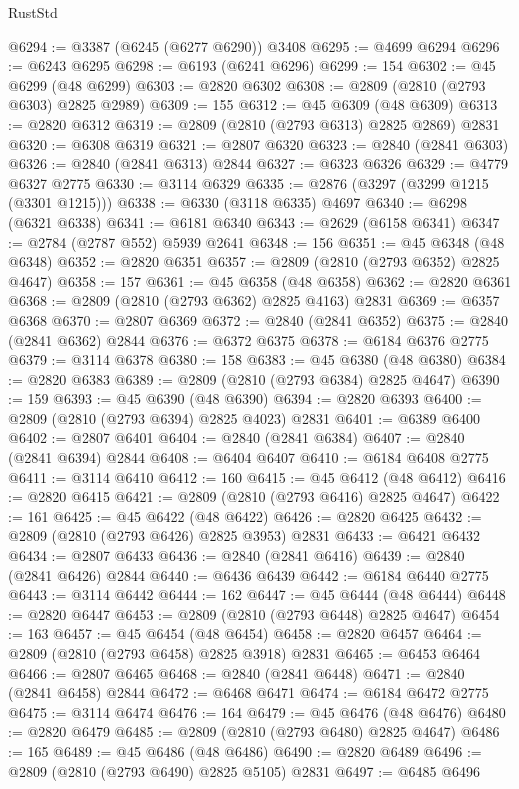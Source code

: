 \begin{lexlean}{RustStd}
\begin{coremodule}
@6294 := @3387 (@6245 (@6277 @6290)) @3408
@6295 := @4699 @6294
@6296 := @6243 @6295
@6298 := @6193 (@6241 @6296)
@6299 := 154
@6302 := @45 @6299 (@48 @6299)
@6303 := @2820 @6302
@6308 := @2809 (@2810 (@2793 @6303) @2825 @2989)
@6309 := 155
@6312 := @45 @6309 (@48 @6309)
@6313 := @2820 @6312
@6319 := @2809 (@2810 (@2793 @6313) @2825 @2869) @2831
@6320 := @6308 @6319
@6321 := @2807 @6320
@6323 := @2840 (@2841 @6303)
@6326 := @2840 (@2841 @6313) @2844
@6327 := @6323 @6326
@6329 := @4779 @6327 @2775
@6330 := @3114 @6329
@6335 := @2876 (@3297 (@3299 @1215 (@3301 @1215)))
@6338 := @6330 (@3118 @6335) @4697
@6340 := @6298 (@6321 @6338)
@6341 := @6181 @6340
@6343 := @2629 (@6158 @6341)
@6347 := @2784 (@2787 @552) @5939 @2641
@6348 := 156
@6351 := @45 @6348 (@48 @6348)
@6352 := @2820 @6351
@6357 := @2809 (@2810 (@2793 @6352) @2825 @4647)
@6358 := 157
@6361 := @45 @6358 (@48 @6358)
@6362 := @2820 @6361
@6368 := @2809 (@2810 (@2793 @6362) @2825 @4163) @2831
@6369 := @6357 @6368
@6370 := @2807 @6369
@6372 := @2840 (@2841 @6352)
@6375 := @2840 (@2841 @6362) @2844
@6376 := @6372 @6375
@6378 := @6184 @6376 @2775
@6379 := @3114 @6378
@6380 := 158
@6383 := @45 @6380 (@48 @6380)
@6384 := @2820 @6383
@6389 := @2809 (@2810 (@2793 @6384) @2825 @4647)
@6390 := 159
@6393 := @45 @6390 (@48 @6390)
@6394 := @2820 @6393
@6400 := @2809 (@2810 (@2793 @6394) @2825 @4023) @2831
@6401 := @6389 @6400
@6402 := @2807 @6401
@6404 := @2840 (@2841 @6384)
@6407 := @2840 (@2841 @6394) @2844
@6408 := @6404 @6407
@6410 := @6184 @6408 @2775
@6411 := @3114 @6410
@6412 := 160
@6415 := @45 @6412 (@48 @6412)
@6416 := @2820 @6415
@6421 := @2809 (@2810 (@2793 @6416) @2825 @4647)
@6422 := 161
@6425 := @45 @6422 (@48 @6422)
@6426 := @2820 @6425
@6432 := @2809 (@2810 (@2793 @6426) @2825 @3953) @2831
@6433 := @6421 @6432
@6434 := @2807 @6433
@6436 := @2840 (@2841 @6416)
@6439 := @2840 (@2841 @6426) @2844
@6440 := @6436 @6439
@6442 := @6184 @6440 @2775
@6443 := @3114 @6442
@6444 := 162
@6447 := @45 @6444 (@48 @6444)
@6448 := @2820 @6447
@6453 := @2809 (@2810 (@2793 @6448) @2825 @4647)
@6454 := 163
@6457 := @45 @6454 (@48 @6454)
@6458 := @2820 @6457
@6464 := @2809 (@2810 (@2793 @6458) @2825 @3918) @2831
@6465 := @6453 @6464
@6466 := @2807 @6465
@6468 := @2840 (@2841 @6448)
@6471 := @2840 (@2841 @6458) @2844
@6472 := @6468 @6471
@6474 := @6184 @6472 @2775
@6475 := @3114 @6474
@6476 := 164
@6479 := @45 @6476 (@48 @6476)
@6480 := @2820 @6479
@6485 := @2809 (@2810 (@2793 @6480) @2825 @4647)
@6486 := 165
@6489 := @45 @6486 (@48 @6486)
@6490 := @2820 @6489
@6496 := @2809 (@2810 (@2793 @6490) @2825 @5105) @2831
@6497 := @6485 @6496

\end{coremodule}
\end{lexlean}

